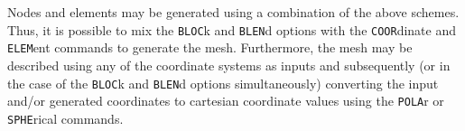 Nodes and elements may be generated using a combination of the
above schemes.  Thus, it is possible to mix the {\tt BLOC}k and
{\tt BLEN}d options with the
{\tt COOR}d\-in\-ate and {\tt ELEM}\-ent commands to generate the mesh.
Furthermore,
the mesh may be described using any of the coordinate systems as inputs
and subsequently (or in the case of the {\tt BLOC}k 
and {\tt BLEN}d options simultaneously)
converting the input and/or generated coordinates to cartesian coordinate
values using the {\tt POLA}r or {\tt SPHE}rical commands.
